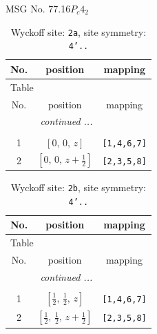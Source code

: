 \documentclass[fleqn,8pt]{jsarticle}
\begin{document}
\setcounter{MaxMatrixCols}{32}

\renewcommand{\tablename}{Table~}
\renewcommand{\figurename}{Figure~}
\begin{center}
\LARGE
MSG No. 77.16\quad$P_{c}4_{2}$
\end{center}
\renewcommand{\arraystretch}{1.2}
\begin{longtable}{ccc}
\caption{Wyckoff site: {\tt 2a}, site symmetry: {\tt 4'..}}
 \\
 \hline \hline
No. & position & mapping \\ \hline \endfirsthead

\multicolumn{2}{l}{\tablename\ \thetable{}} \\
 \hline \hline
No. & position & mapping \\ \hline \endhead

 \hline \hline
\multicolumn{2}{r}{\footnotesize\it continued ...} \\ \endfoot

 \hline \hline
\multicolumn{2}{r}{} \\ \endlastfoot

1 & $\left[ 0,\, 0,\, z \right]$ & {\tt [1,4,6,7]} \\ \hline
2 & $\left[ 0,\, 0,\, z + \frac{1}{2} \right]$ & {\tt [2,3,5,8]} \\
\end{longtable}
\renewcommand{\arraystretch}{1.2}
\begin{longtable}{ccc}
\caption{Wyckoff site: {\tt 2b}, site symmetry: {\tt 4'..}}
 \\
 \hline \hline
No. & position & mapping \\ \hline \endfirsthead

\multicolumn{2}{l}{\tablename\ \thetable{}} \\
 \hline \hline
No. & position & mapping \\ \hline \endhead

 \hline \hline
\multicolumn{2}{r}{\footnotesize\it continued ...} \\ \endfoot

 \hline \hline
\multicolumn{2}{r}{} \\ \endlastfoot

1 & $\left[ \frac{1}{2},\, \frac{1}{2},\, z \right]$ & {\tt [1,4,6,7]} \\ \hline
2 & $\left[ \frac{1}{2},\, \frac{1}{2},\, z + \frac{1}{2} \right]$ & {\tt [2,3,5,8]} \\
\end{longtable}
\end{document}
